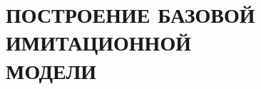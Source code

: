 \section[Построение базовой имитационной модели]{ПОСТРОЕНИЕ БАЗОВОЙ ИМИТАЦИОННОЙ \\
МОДЕЛИ}



\pagebreak
